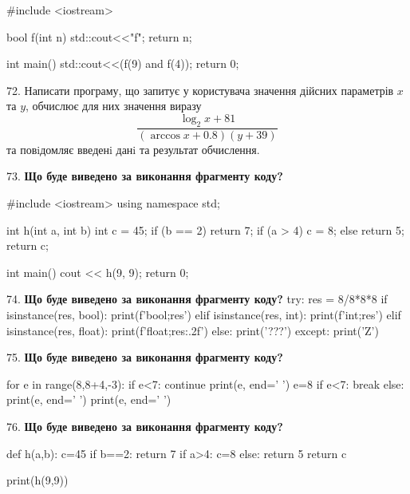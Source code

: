 \documentclass[11pt]{article}
\begin{document}
#include <iostream>

bool f(int n){
    std::cout<<"f";
    return n;
}

int main(){
    std::cout<<(f(9) and f(4));
    return 0;
}
\par\vspace{5mm}

72. 
Написати програму, що запитує у користувача значення дійсних параметрів $x$ та $y$, обчислює для них значення виразу 
$$\frac{\log_{2} x + 81}{(\arccos x + 0.8) (y + 39)}$$ 
та повiдомляє введенi данi та результат обчислення.

\par\vspace{5mm}

73. \textbf{Що буде виведено за виконання фрагменту коду?}

#include <iostream>
using namespace std;

int h(int a, int b){
    int c = 45;
    if (b == 2)
        return 7;
    if (a > 4)
         c = 8;
    else 
        return 5;
    return c;
}

int main(){
    cout << h(9, 9);
    return 0;
}
\par\vspace{5mm}

74. \textbf{Що буде виведено за виконання фрагменту коду?}
try:
    res = 8/8*8*8
    if isinstance(res, bool):
        print(f'bool;{res}')
    elif isinstance(res, int):
        print(f'int;{res}')
    elif isinstance(res, float):
        print(f'float;{res:.2f}')
    else:
        print('???')
except:
    print('Z')
\par\vspace{5mm}

75. \textbf{Що буде виведено за виконання фрагменту коду?}

for e in range(8,8+4,-3):
    if e<7:
        continue
    print(e, end=' ')
    e=8
    if e<7:
        break
else:
    print(e, end=' ')
print(e, end=' ')
\par\vspace{5mm}

76. \textbf{Що буде виведено за виконання фрагменту коду?}

def h(a,b):
    c=45
    if b==2:
        return 7
    if a>4:
         c=8
    else: 
        return 5
    return c

print(h(9,9))\par\vspace{5mm}
\end{document}
